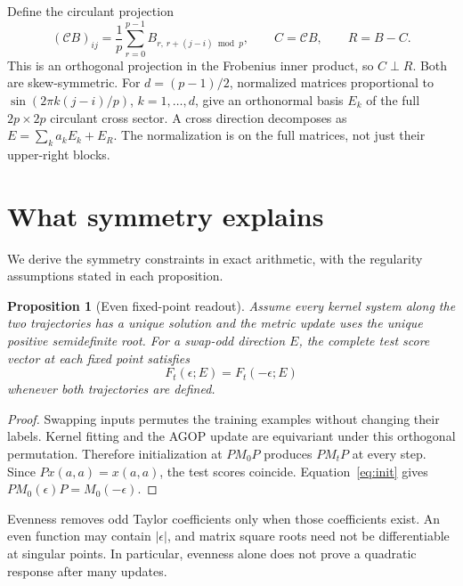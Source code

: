 \documentclass[11pt]{article}
\newtheorem{proposition}{Proposition}
\newcommand{\Cproj}{\mathcal C}
\begin{document}
Define the circulant projection
\begin{equation}
 (\Cproj B)_{ij}=\frac1p\sum_{r=0}^{p-1}B_{r,\,r+(j-i)\bmod p},\qquad C=\Cproj B,\qquad R=B-C.\label{eq:projection}
\end{equation}
This is an orthogonal projection in the Frobenius inner product, so $C\perp R$. Both are skew-symmetric. For $d=(p-1)/2$, normalized matrices proportional to $\sin(2\pi k(j-i)/p)$, $k=1,\ldots,d$, give an orthonormal basis $E_k$ of the full $2p\times2p$ circulant cross sector. A cross direction decomposes as $E=\sum_k a_k E_k+E_R$. The normalization is on the full matrices, not just their upper-right blocks.

\section{What symmetry explains}\label{sec:theory}
We derive the symmetry constraints in exact arithmetic, with the regularity assumptions stated in each proposition.

\begin{proposition}[Even fixed-point readout]\label{prop:even}
Assume every kernel system along the two trajectories has a unique solution and the metric update uses the unique positive semidefinite root. For a swap-odd direction $E$, the complete test score vector at each fixed point satisfies
\begin{equation}
 F_t(\epsilon;E)=F_t(-\epsilon;E)
\end{equation}
whenever both trajectories are defined.
\end{proposition}
\begin{proof}
Swapping inputs permutes the training examples without changing their labels. Kernel fitting and the AGOP update are equivariant under this orthogonal permutation. Therefore initialization at $PM_0P$ produces $PM_tP$ at every step. Since $Px(a,a)=x(a,a)$, the test scores coincide. Equation~\eqref{eq:init} gives $PM_0(\epsilon)P=M_0(-\epsilon)$.
\end{proof}
Evenness removes odd Taylor coefficients only when those coefficients exist. An even function may contain $|\epsilon|$, and matrix square roots need not be differentiable at singular points. In particular, evenness alone does not prove a quadratic response after many updates.
\end{document}
